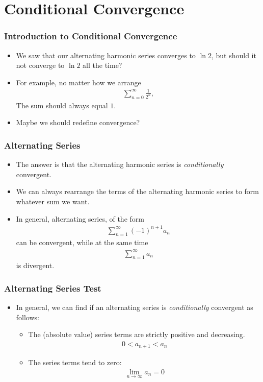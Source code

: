 \documentclass{beamer}
\begin{document}
\section{Conditional Convergence}
\begin{frame}
  \frametitle{Introduction to Conditional Convergence}
  \begin{itemize}
    \item<1-> We saw that our alternating harmonic series converges to $\ln 2$, but should it not converge to $\ln 2$ all the time?
    \item<2-> For example, no matter how we arrange
      \begin{align*}
        \sum_{n=0}^{\infty}\frac{1}{2^n},
      \end{align*}
      The sum should always equal $1$.
    \item<3-> Maybe we should redefine convergence?
  \end{itemize}
\end{frame}
\begin{frame}
  \frametitle{Alternating Series}
  \begin{itemize}
    \item<1-> The answer is that the alternating harmonic series is \textit{conditionally} convergent.
    \item<2-> We can always rearrange the terms of the alternating harmonic series to form whatever sum we want.
    \item<3-> In general, alternating series, of the form
      \begin{align*}
        \sum_{n=1}^{\infty}(-1)^{n+1}a_n
      \end{align*}
      can be convergent, while at the same time
      \begin{align*}
        \sum_{n=1}^{\infty} a_n
      \end{align*}
      is divergent.
  \end{itemize}
\end{frame}
\begin{frame}
  \frametitle{Alternating Series Test}
  \begin{itemize}
    \item<1-> In general, we can find if an alternating series is \textit{conditionally} convergent as follows:
    \begin{itemize}
      \item<2-> The (absolute value) series terms are strictly positive and decreasing.
        \begin{align*}
          0 < a_{n+1} < a_n
        \end{align*}
      \item<3-> The series terms tend to zero:
        \begin{align*}
          \lim_{n\rightarrow\infty}a_n = 0
        \end{align*}
    \end{itemize}
  \end{itemize}
\end{frame}
\end{document}

